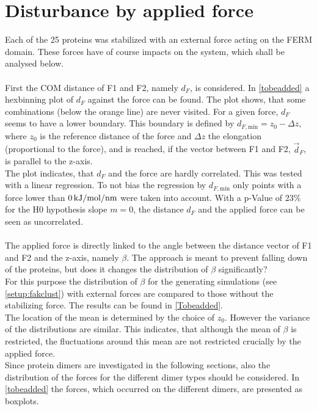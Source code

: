 \section{Disturbance by applied force}
Each of the 25 proteins was stabilized with an external force acting on the FERM domain. These forces have of course impacts on the system, which shall be analysed below.\\%
\\
First the COM distance of F1 and F2, namely $d_F$, is considered. In \autoref{tobeadded} a hexbinning plot of $d_F$ against the force can be found. The plot shows, that some combinations (below the orange line) are never visited. For a given force, $d_F$ seems to have a lower boundary. This boundary is defined by $d_{F, \text{min}} = z_0 - \Delta z$, where $z_0$ is the reference distance of the force and $\Delta z$ the elongation (proportional to the force), and is reached, if the vector between F1 and F2, $\vec{d}_F$, is parallel to the z-axis.\\
The plot indicates, that $d_F$ and the force are hardly correlated. This was tested with a linear regression. To not bias the regression by $d_{F, \text{min}}$ only points with a force lower than $0\,\si{\kilo\joule/\mole/\nano\metre}$ were taken into account. With a p-Value of $23\%$ for the H0 hypothesis slope $m = 0$, the distance $d_F$ and the applied force can be seen as uncorrelated.\\
\\
The applied force is directly linked to the angle between the distance vector of F1 and F2 and the z-axis, namely $\beta$. The approach is meant to prevent falling down of the proteins, but does it changes the distribution of $\beta$ significantly?\\
For this purpose the distribution of $\beta$ for the generating simulations (see \autoref{setup:fakclust}) with external forces are compared to those without the stabilizing force. The results can be found in \autoref{Tobeadded}.\\
The location of the mean is determined by the choice of $z_0$. However the variance of the distributions are similar. This indicates, that although the mean of $\beta$ is restricted, the fluctuations around this mean are not restricted crucially by the applied force.
\\
Since protein dimers are investigated in the following sections, also the distribution of the forces for the different dimer types should be considered. In \autoref{tobeadded} the forces, which occurred on the different dimers, are presented as boxplots. %
